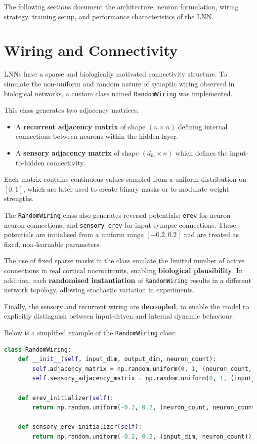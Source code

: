The following sections document the architecture, neuron formulation, wiring strategy, training setup, and performance characteristics of the LNN.

\section{Wiring and Connectivity}
LNNs have a sparse and biologically motivated connectivity structure. To simulate the non-uniform and random nature of synaptic wiring observed in biological networks, a custom class named \texttt{RandomWiring} was implemented.

This class generates two adjacency matrices:
\begin{itemize}
    \item A \textbf{recurrent adjacency matrix} of shape $(n \times n)$ defining internal connections between neurons within the hidden layer.
    \item A \textbf{sensory adjacency matrix} of shape $(d_{\text{in}} \times n)$ which defines the input-to-hidden connectivity.
\end{itemize}
Each matrix contains continuous values sampled from a uniform distribution on $[0, 1]$, which are later used to create binary masks or to modulate weight strengths.

The \texttt{RandomWiring} class also generates reversal potentials: \texttt{erev} for neuron-neuron connections, and \texttt{sensory\_erev} for input-synapse connections. These potentials are initialised from a uniform range $[-0.2, 0.2]$ and are treated as fixed, non-learnable parameters.

The use of fixed sparse masks in the class emulate the limited number of active connections in real cortical microcircuits, enabling \textbf{biological plausibility}. In addition, each \textbf{randomised instantiation} of \texttt{RandomWiring} results in a different network topology, allowing stochastic variation in experiments.

Finally, the sensory and recurrent wiring are \textbf{decoupled}, to enable the model to explicitly distinguish between input-driven and internal dynamic behaviour.

Below is a simplified example of the \texttt{RandomWiring} class:
\begin{lstlisting}[language=Python, caption={Simplified RandomWiring class}]
class RandomWiring:
    def __init__(self, input_dim, output_dim, neuron_count):
        self.adjacency_matrix = np.random.uniform(0, 1, (neuron_count, neuron_count))
        self.sensory_adjacency_matrix = np.random.uniform(0, 1, (input_dim, neuron_count))
        
    def erev_initializer(self):
        return np.random.uniform(-0.2, 0.2, (neuron_count, neuron_count))

    def sensory_erev_initializer(self):
        return np.random.uniform(-0.2, 0.2, (input_dim, neuron_count))
\end{lstlisting}

